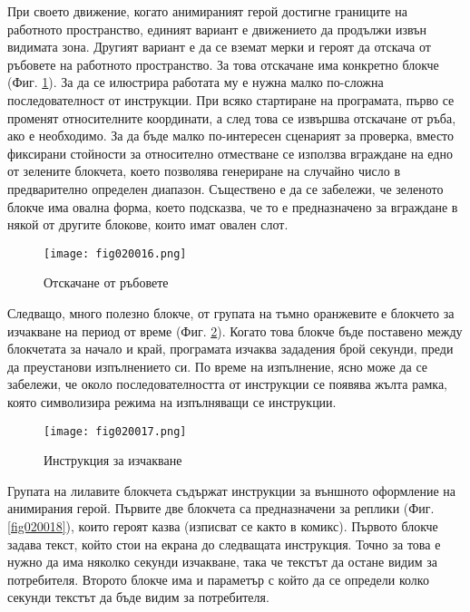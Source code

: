 При своето движение, когато анимираният герой достигне границите на работното пространство, единият вариант е движението да продължи извън видимата зона. Другият вариант е да се вземат мерки и героят да отскача от ръбовете на работното пространство. За това отскачане има конкретно блокче (Фиг. \ref{fig020016}). За да се илюстрира работата му е нужна малко по-сложна последователност от инструкции. При всяко стартиране на програмата, първо се променят относителните координати, а след това се извършва отскачане от ръба, ако е необходимо. За да бъде малко по-интересен сценарият за проверка, вместо фиксирани стойности за относително отместване се използва вграждане на едно от зелените блокчета, което позволява генериране на случайно число в предварително определен диапазон. Съществено е да се забележи, че зеленото блокче има овална форма, което подсказва, че то е предназначено за вграждане в някой от другите блокове, които имат овален слот. 

\begin{figure}[H]
  \centering
  \texttt{[image: fig020016.png]}
  \caption{Отскачане от ръбовете}
\label{fig020016}
\end{figure}

Следващо, много полезно блокче, от групата на тъмно оранжевите е блокчето за изчакване на период от време (Фиг. \ref{fig020017}). Когато това блокче бъде поставено между блокчетата за начало и край, програмата изчаква зададения брой секунди, преди да преустанови изпълнението си. По време на изпълнение, ясно може да се забележи, че около последователността от инструкции се появява жълта рамка, която символизира режима на изпълняващи се инструкции. 

\begin{figure}[H]
  \centering
  \texttt{[image: fig020017.png]}
  \caption{Инструкция за изчакване}
\label{fig020017}
\end{figure}

Групата на лилавите блокчета съдържат инструкции за външното оформление на анимирания герой. Първите две блокчета са предназначени за реплики (Фиг. \ref{fig020018}), които героят казва (изписват се както в комикс). Първото блокче задава текст, който стои на екрана до следващата инструкция. Точно за това е нужно да има няколко секунди изчакване, така че текстът да остане видим за потребителя. Второто блокче има и параметър с който да се определи колко секунди текстът да бъде видим за потребителя. 

